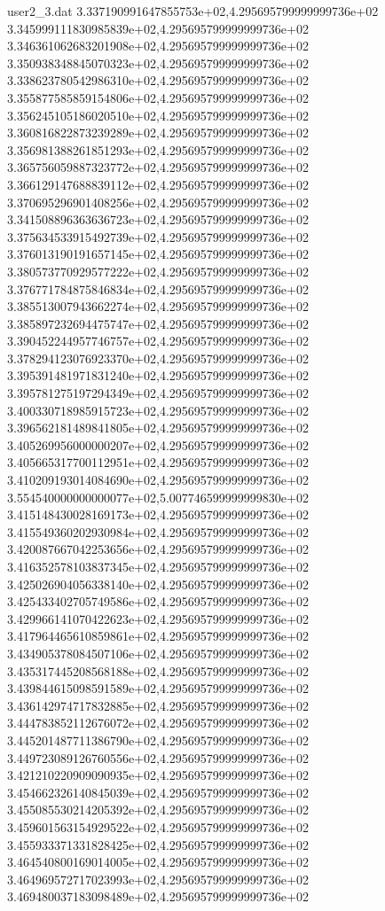 \begin{filecontents}{user2_3.dat}
3.337190991647855753e+02,4.295695799999999736e+02
3.345999111830985839e+02,4.295695799999999736e+02
3.346361062683201908e+02,4.295695799999999736e+02
3.350938348845070323e+02,4.295695799999999736e+02
3.338623780542986310e+02,4.295695799999999736e+02
3.355877585859154806e+02,4.295695799999999736e+02
3.356245105186020510e+02,4.295695799999999736e+02
3.360816822873239289e+02,4.295695799999999736e+02
3.356981388261851293e+02,4.295695799999999736e+02
3.365756059887323772e+02,4.295695799999999736e+02
3.366129147688839112e+02,4.295695799999999736e+02
3.370695296901408256e+02,4.295695799999999736e+02
3.341508896363636723e+02,4.295695799999999736e+02
3.375634533915492739e+02,4.295695799999999736e+02
3.376013190191657145e+02,4.295695799999999736e+02
3.380573770929577222e+02,4.295695799999999736e+02
3.376771784875846834e+02,4.295695799999999736e+02
3.385513007943662274e+02,4.295695799999999736e+02
3.385897232694475747e+02,4.295695799999999736e+02
3.390452244957746757e+02,4.295695799999999736e+02
3.378294123076923370e+02,4.295695799999999736e+02
3.395391481971831240e+02,4.295695799999999736e+02
3.395781275197294349e+02,4.295695799999999736e+02
3.400330718985915723e+02,4.295695799999999736e+02
3.396562181489841805e+02,4.295695799999999736e+02
3.405269956000000207e+02,4.295695799999999736e+02
3.405665317700112951e+02,4.295695799999999736e+02
3.410209193014084690e+02,4.295695799999999736e+02
3.554540000000000077e+02,5.007746599999999830e+02
3.415148430028169173e+02,4.295695799999999736e+02
3.415549360202930984e+02,4.295695799999999736e+02
3.420087667042253656e+02,4.295695799999999736e+02
3.416352578103837345e+02,4.295695799999999736e+02
3.425026904056338140e+02,4.295695799999999736e+02
3.425433402705749586e+02,4.295695799999999736e+02
3.429966141070422623e+02,4.295695799999999736e+02
3.417964465610859861e+02,4.295695799999999736e+02
3.434905378084507106e+02,4.295695799999999736e+02
3.435317445208568188e+02,4.295695799999999736e+02
3.439844615098591589e+02,4.295695799999999736e+02
3.436142974717832885e+02,4.295695799999999736e+02
3.444783852112676072e+02,4.295695799999999736e+02
3.445201487711386790e+02,4.295695799999999736e+02
3.449723089126760556e+02,4.295695799999999736e+02
3.421210220909090935e+02,4.295695799999999736e+02
3.454662326140845039e+02,4.295695799999999736e+02
3.455085530214205392e+02,4.295695799999999736e+02
3.459601563154929522e+02,4.295695799999999736e+02
3.455933371331828425e+02,4.295695799999999736e+02
3.464540800169014005e+02,4.295695799999999736e+02
3.464969572717023993e+02,4.295695799999999736e+02
3.469480037183098489e+02,4.295695799999999736e+02

\end{filecontents}

